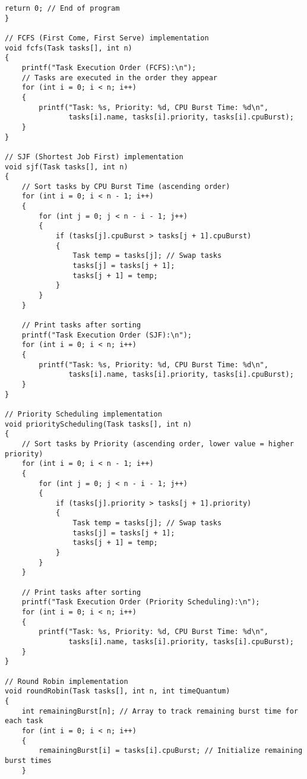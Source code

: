 \documentclass[a4paper,12pt]{article}
\begin{document}
\begin{lstlisting}[caption={CPU Scheduling Algorithms Implementation}, label={lst:cpu-scheduling}]
    return 0; // End of program
}

// FCFS (First Come, First Serve) implementation
void fcfs(Task tasks[], int n)
{
    printf("Task Execution Order (FCFS):\n");
    // Tasks are executed in the order they appear
    for (int i = 0; i < n; i++)
    {
        printf("Task: %s, Priority: %d, CPU Burst Time: %d\n",
               tasks[i].name, tasks[i].priority, tasks[i].cpuBurst);
    }
}

// SJF (Shortest Job First) implementation
void sjf(Task tasks[], int n)
{
    // Sort tasks by CPU Burst Time (ascending order)
    for (int i = 0; i < n - 1; i++)
    {
        for (int j = 0; j < n - i - 1; j++)
        {
            if (tasks[j].cpuBurst > tasks[j + 1].cpuBurst)
            {
                Task temp = tasks[j]; // Swap tasks
                tasks[j] = tasks[j + 1];
                tasks[j + 1] = temp;
            }
        }
    }

    // Print tasks after sorting
    printf("Task Execution Order (SJF):\n");
    for (int i = 0; i < n; i++)
    {
        printf("Task: %s, Priority: %d, CPU Burst Time: %d\n",
               tasks[i].name, tasks[i].priority, tasks[i].cpuBurst);
    }
}

// Priority Scheduling implementation
void priorityScheduling(Task tasks[], int n)
{
    // Sort tasks by Priority (ascending order, lower value = higher priority)
    for (int i = 0; i < n - 1; i++)
    {
        for (int j = 0; j < n - i - 1; j++)
        {
            if (tasks[j].priority > tasks[j + 1].priority)
            {
                Task temp = tasks[j]; // Swap tasks
                tasks[j] = tasks[j + 1];
                tasks[j + 1] = temp;
            }
        }
    }

    // Print tasks after sorting
    printf("Task Execution Order (Priority Scheduling):\n");
    for (int i = 0; i < n; i++)
    {
        printf("Task: %s, Priority: %d, CPU Burst Time: %d\n",
               tasks[i].name, tasks[i].priority, tasks[i].cpuBurst);
    }
}

// Round Robin implementation
void roundRobin(Task tasks[], int n, int timeQuantum)
{
    int remainingBurst[n]; // Array to track remaining burst time for each task
    for (int i = 0; i < n; i++)
    {
        remainingBurst[i] = tasks[i].cpuBurst; // Initialize remaining burst times
    }


\end{lstlisting}
\end{document}
